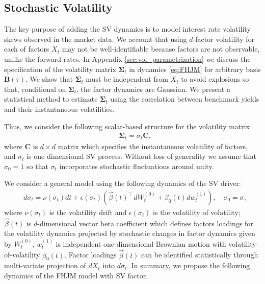 \documentclass[pdftex,11pt,a4paper] {article}
\begin{document}
\subsection{Stochastic Volatility}

The key purpose of adding the SV dynamics is to model interest rate volatility skews observed in the market data. We account that using $d$-factor volatility for each of factors $X_{t}$ may not be well-identifiable because factors are not observable, unlike the forward rates. In Appendix \ref{sec:vol_parametrization} we discuss the specification of the volatility matrix $\mathbf{\Sigma}_{t}$ in dynamics \eqref{eq:FHJM} for arbitrary basis $\mathbf{B}(\tau)$. We show that $\mathbf{\Sigma}_{t}$ must be independent from $X_{t}$ to avoid explosions so that, conditional on $\mathbf{\Sigma}_{t}$, the factor dynamics are Gaussian. We present a statistical method to estimate $\mathbf{\Sigma}_{t}$ using the correlation between benchmark yields and their instantaneous volatilities.

Thus, we consider the following scalar-based structure for the volatility matrix
\begin{equation}\label{eq:eq3}
\begin{split}
&   \mathbf{\Sigma}_{t} = \sigma_t \mathbf{C},
\end{split}
\end{equation}
where $\mathbf{C}$ is $d\times d$ matrix which specifies the instantaneous volatility of factors, and $\sigma_t$ is one-dimensional SV process. Without loss of generality we assume that $\sigma_{0}=1$ so that $\sigma_t$ incorporates stochastic fluctuations around unity.

We consider a general model using the following dynamics of the SV driver:
\begin{equation}\label{eq:mdsv}
\begin{split}
&d\sigma_t=  \nu(\sigma_{t})dt +  \epsilon(\sigma_t)\left(\vec{\beta}(t)^\top\,dW^{(0)}_t + \beta_{0}(t)dw^{(1)}_t\right),\quad \sigma_0=\sigma,
\end{split}
\end{equation}
where $\nu(\sigma_{t})$ is the volatility drift and $\epsilon(\sigma_t)$ is the volatility of volatility; $\vec{\beta}(t)$ is $d$-dimensional vector beta coefficient which defines factors loadings for the volatility dynamics projected by stochastic changes in factor dynamics given by $W^{(0)}_t$, $w^{(1)}_t$ is independent one-dimensional Brownian motion with volatility-of-volatility $\beta_{0}(t)$. Factor loadings $\vec{\beta}(t)$ can be identified statistically through multi-variate projection of $dX_t$ into $d\sigma_t$. In summary, we propose the following dynamics of the FHJM model with SV factor.
\end{document}
